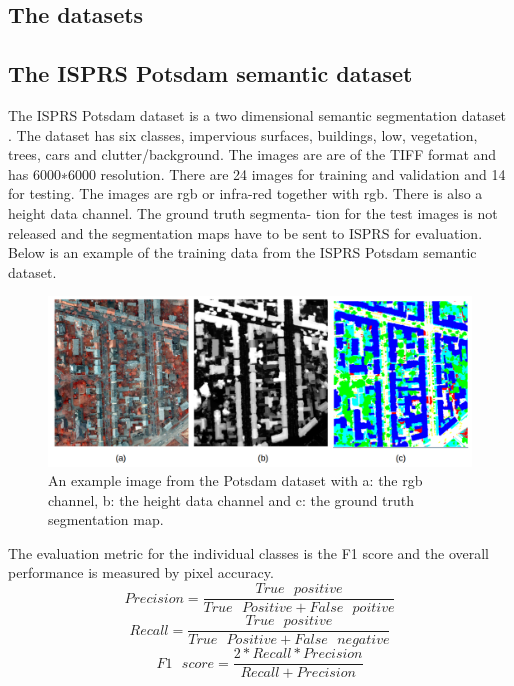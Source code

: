 \documentclass[a4paper,11pt]{article}
\begin{document}
\subsection{The datasets}
\subsection{The ISPRS Potsdam semantic dataset}
The ISPRS Potsdam dataset is a two dimensional semantic segmentation
dataset \cite{noauthor_2d_nodate}. The dataset has six classes, impervious surfaces, buildings, low, vegetation, trees, cars and clutter/background. The images are are of the TIFF format and has 6000∗6000 resolution. There are 24 images for training
and validation and 14 for testing. The images are rgb or infra-red together
with rgb. There is also a height data channel. The ground truth segmenta-
tion for the test images is not released and the segmentation maps have to
be sent to ISPRS for evaluation. Below is an example of the training data from the ISPRS Potsdam semantic dataset.
\begin{center}
\begin{figure}[H]
      \includegraphics[scale=0.25]{potsdam}
  \caption{An example image from the Potsdam dataset with a: the rgb
channel, b: the height data channel and c: the ground truth segmentation
map.}
\end{figure}
\end{center}
The evaluation metric for the individual classes is the F1 score and the
overall performance is measured by pixel accuracy.
\begin{equation}\label{eq:precision}
Precision=\frac{True\textit{ }positive}{True\textit{ }Positive+False\textit{ }poitive}
\end{equation}
\begin{equation}\label{eq:recall}
Recall=\frac{True\textit{ }positive}{True\textit{ }Positive+False\textit{ }negative}
\end{equation}
\begin{equation}\label{eq:f1}
F1\textit{ }score=\frac{2*Recall*Precision}{Recall+Precision}
\end{equation}
\end{document}
